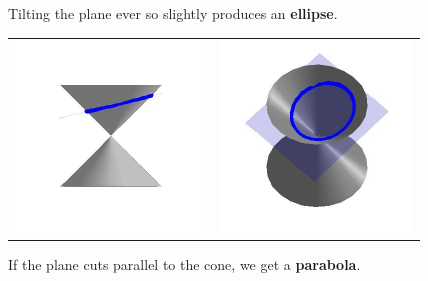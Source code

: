 \documentclass{ximera}
\begin{document}
\pagebreak

Tilting the plane ever so slightly produces an  \textbf{ellipse}.

\begin{center}

\begin{tabular}{cc}

\includegraphics[width=2in]{./IntrotoConicsGraphics/Ellipse01.jpg} & \includegraphics[width=2in]{./IntrotoConicsGraphics/Ellipse02.jpg} \\

\end{tabular}

\end{center}

If the plane cuts parallel to the cone, we get a  \textbf{parabola}.
\end{document}
